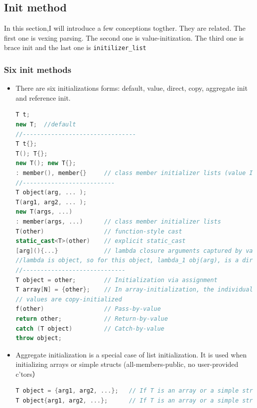 \documentclass[a4paper,12pt,twoside]{book}
\begin{document}
\subsection{Init method}
In this section,I will introduce a few conceptions togther. They are related. The first one is vexing parsing. The second one is value-initization. The third one is brace init and the last one is \texttt{initilizer\_list}

\subsubsection{Six init methods}
\begin{itemize}
	\item There are six initializations forms: default, value, direct, copy, aggregate init and reference init.
\begin{lstlisting}[frame=single, language=c++]
T t;
new T;  //default
//--------------------------------
T t{};
T(); T{};
new T(); new T{};
: member(), member{}     // class member initializer lists (value Init)
//--------------------------
T object(arg, ... );
T(arg1, arg2, ... );
new T(args, ...)
: member(args, ...)      // class member initializer lists
T(other)                 // function-style cast
static_cast<T>(other)    // explicit static_cast
[arg](){...}             // lambda closure arguments captured by value
//lambda is object, so for this object, lambda_1 obj(arg), is a direct init
//-----------------------------
T object = other;        // Initialization via assignment
T array[N] = {other};    // In array-initialization, the individual
// values are copy-initialized
f(other)                 // Pass-by-value
return other;            // Return-by-value
catch (T object)         // Catch-by-value
throw object;
\end{lstlisting}


\item Aggregate initialization is a special case of list initialization. It is used when initializing arrays or simple structs (all-members-public, no user-provided c'tors）
\begin{lstlisting}[frame=single, language=c++]
T object = {arg1, arg2, ...};   // If T is an array or a simple struct
T object{arg1, arg2, ...};      // If T is an array or a simple struct
\end{lstlisting}


\end{itemize}
\end{document}
